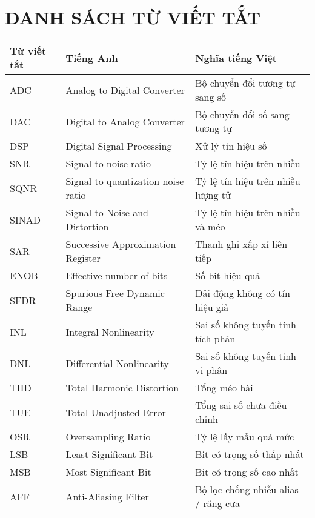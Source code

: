 \documentclass[a4paper,13pt]{article}
\begin{document}
\clearpage
\begin{table}[h]
    \centering
    \section{DANH SÁCH TỪ VIẾT TẮT}
    \begin{tabular}{lll}
        \toprule
        \textbf{Từ viết tắt} & \textbf{Tiếng Anh} & \textbf{Nghĩa tiếng Việt} \\
        \midrule
        ADC & Analog to Digital Converter & Bộ chuyển đổi tương tự sang số \\
        DAC & Digital to Analog Converter & Bộ chuyển đổi số sang tương tự \\
        DSP & Digital Signal Processing & Xử lý tín hiệu số \\
        SNR & Signal to noise ratio & Tỷ lệ tín hiệu trên nhiễu \\
        SQNR & Signal to quantization noise ratio & Tỷ lệ tín hiệu trên nhiễu lượng tử \\
        SINAD & Signal to Noise and Distortion & Tỷ lệ tín hiệu trên nhiễu và méo \\
        SAR & Successive Approximation Register & Thanh ghi xấp xỉ liên tiếp \\
        ENOB & Effective number of bits & Số bit hiệu quả \\
        SFDR & Spurious Free Dynamic Range & Dải động không có tín hiệu giả \\
        INL & Integral Nonlinearity & Sai số không tuyến tính tích phân \\
        DNL & Differential Nonlinearity & Sai số không tuyến tính vi phân \\
        THD & Total Harmonic Distortion & Tổng méo hài \\
        TUE & Total Unadjusted Error & Tổng sai số chưa điều chỉnh \\
        OSR & Oversampling Ratio & Tỷ lệ lấy mẫu quá mức \\
        LSB & Least Significant Bit & Bit có trọng số thấp nhất \\
        MSB & Most Significant Bit & Bit có trọng số cao nhất \\
        AFF & Anti-Aliasing Filter & Bộ lọc chống nhiễu alias / răng cưa \\
        \bottomrule
    \end{tabular}
\end{table}


\clearpage
\end{document}
